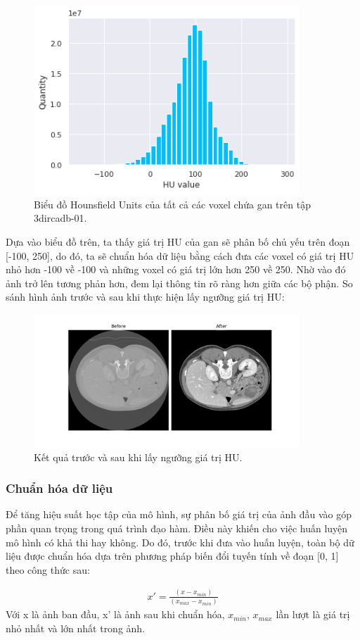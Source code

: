 \begin{figure}[H]
    \centering
    \includegraphics[width=10cm]{images/experiments/hu_dist_liver.png}
    \caption{Biểu đồ Hounsfield Units của tất cả các voxel chứa gan trên tập 3dircadb-01.}
\end{figure}
\vspace{-0.5cm}
Dựa vào biểu đồ trên, ta thấy giá trị HU của gan sẽ phân bố chủ yếu trên đoạn [-100, 250], do đó, ta sẽ chuẩn hóa dữ liệu bằng cách đưa các voxel có giá trị HU nhỏ hơn -100 về -100 và những voxel có giá trị lớn hơn 250 về 250. Nhờ vào đó ảnh trở lên tương phản hơn, đem lại thông tin rõ ràng hơn giữa các bộ phận. So sánh hình ảnh trước và sau khi thực hiện lấy ngưỡng giá trị HU:
\vspace{-0.5cm}
\begin{figure}[H]
    \centering
    \includegraphics[width=10cm]{images/experience/HU-before-after.png}
    \caption{Kết quả trước và sau khi lấy ngưỡng giá trị HU.}
\end{figure}

\subsubsection{Chuẩn hóa dữ liệu}
Để tăng hiệu suất học tập của mô hình, sự phân bố giá trị của ảnh đầu vào góp phần quan trọng trong quá trình đạo hàm. Điều này khiến cho việc huấn luyện mô hình có khả thi hay không. Do đó, trước khi đưa vào huấn luyện, toàn bộ dữ liệu được chuẩn hóa dựa trên phương pháp biến đổi tuyến tính về đoạn [0, 1] theo công thức sau: \par
\vspace{-0.8cm}
\begin{align}
x' = \frac{(x-x_{min})}{(x_{max}-x_{min})}
\end{align}
Với x là ảnh ban đầu, x’ là ảnh sau khi chuẩn hóa, $x_{min}$, $x_{max}$ lần lượt là giá trị nhỏ nhất và lớn nhất trong ảnh.\par
\vspace{-0.5cm}

